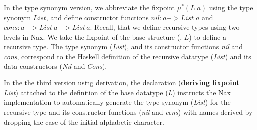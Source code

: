 In the type synonym version, we abbreviate the fixpoint $\mu^{*}(L\;a)$
using the type synonym $List$, and define constructor functions
$\textit{nil} : a -> \textit{List}\;a$ and
$\textit{cons} : a -> \textit{List}~a -> \textit{List}~a$.
Recall, that we define recursive types using two levels in Nax.
We take the fixpoint of the base structure (\eg, $L$) to define a recursive type.
The type synonym (\textit{List}), and its constructor functions
\textit{nil} and \textit{cons}, correspond to the Haskell definition of
the recursive datatype (\textit{List}) and its data constructors
(\textit{Nil} and \textit{Cons}).

In the the third version using derivation, the declaration
(\textbf{deriving fixpoint} \textit{List}) attached to
the definition of the base datatype ($L$) instructs
the Nax implementation to automatically generate the type synonym 
(\textit{List}) for the recursive type and its constructor functions
(\textit{nil} and \textit{cons}) with names derived by dropping the case
of the initial alphabetic character.

